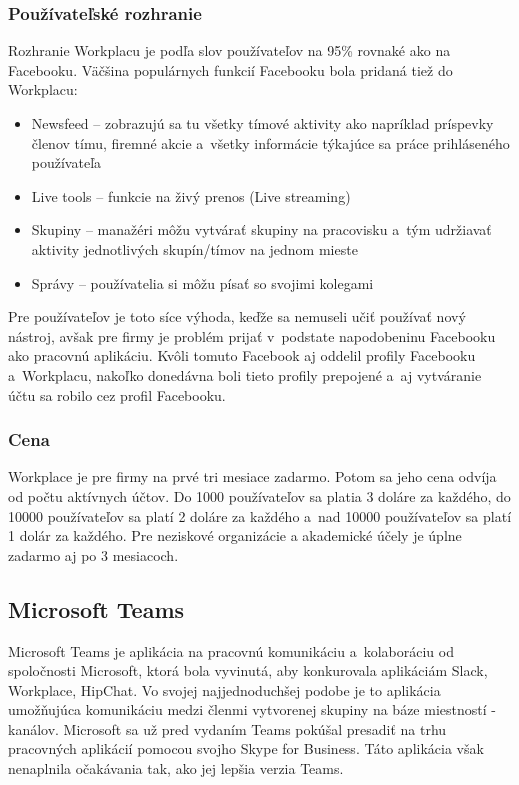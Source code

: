 \subsubsection{Používateľské rozhranie}
\indent Rozhranie Workplacu je podľa slov používateľov na 95\% rovnaké ako na Facebooku. Väčšina populárnych funkcií Facebooku bola pridaná tiež do Workplacu:
\begin{itemize}
    \item Newsfeed – zobrazujú sa tu všetky tímové aktivity ako napríklad príspevky členov tímu, firemné akcie a všetky informácie týkajúce sa práce prihláseného používateľa
    \item Live tools – funkcie na živý prenos (Live streaming)
    \item Skupiny – manažéri môžu vytvárať skupiny na pracovisku a tým udržiavať aktivity jednotlivých skupín/tímov na jednom  mieste
    \item Správy – používatelia si môžu písať so svojimi kolegami
\end{itemize}

\indent Pre používateľov je toto síce výhoda, keďže sa nemuseli učiť používať nový nástroj, avšak pre firmy je problém prijať v podstate napodobeninu Facebooku ako pracovnú aplikáciu. Kvôli tomuto Facebook aj oddelil profily Facebooku a Workplacu, nakoľko donedávna boli tieto profily prepojené a aj vytváranie účtu sa robilo cez profil Facebooku. 
\subsubsection{Cena}
\indent Workplace je pre firmy na prvé tri mesiace zadarmo. Potom sa jeho cena odvíja od počtu aktívnych účtov. Do 1000 používateľov sa platia 3 doláre za každého, do 10000 používateľov sa platí 2 doláre za každého a nad 10000 používateľov sa platí 1 dolár za každého.  Pre neziskové organizácie a akademické účely je úplne zadarmo aj po 3 mesiacoch\cite{facebook_workplace,facebook_workplace_2}.

\subsection{Microsoft Teams}
\indent Microsoft Teams je aplikácia na pracovnú komunikáciu a kolaboráciu od spoločnosti Microsoft, ktorá bola vyvinutá, aby konkurovala aplikáciám Slack, Workplace, HipChat. Vo svojej najjednoduchšej podobe je to aplikácia umožňujúca komunikáciu medzi členmi vytvorenej skupiny na báze miestností - kanálov. Microsoft sa už pred vydaním Teams pokúšal presadiť na trhu pracovných aplikácií pomocou svojho Skype for Business. Táto aplikácia však nenaplnila očakávania tak, ako jej lepšia verzia Teams\cite{ms_teams}. 
